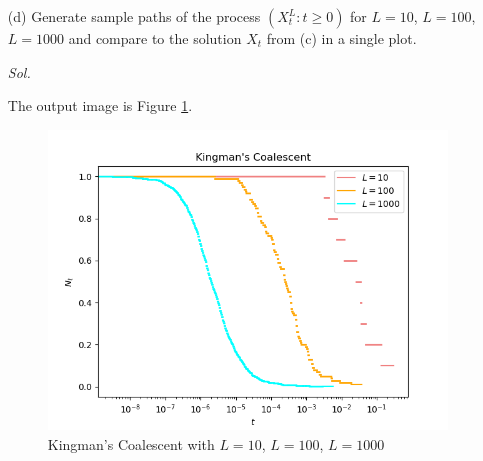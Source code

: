 \begin{enumerate}
    \item[(d)] Generate sample paths of the process $(X_t^L: t \ge 0)$ for $L = 10$, $L = 100$, $L = 1000$ and compare to the solution $X_t$ from (c) in a single plot.
      
    \textit{ Sol. }
    
    The output image is Figure \ref{fig1}.
    \begin{figure}[h!]
        \includegraphics[width=18cm]{Kingman_Coalescent.png}
        \caption{Kingman's Coalescent with $L = 10$, $L = 100$, $L = 1000$}
        \label{fig1}
    \end{figure}
\end{enumerate}